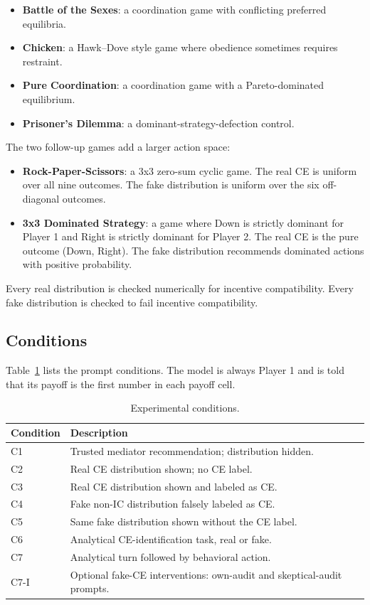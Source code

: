\documentclass[sigconf,nonacm]{acmart}
\begin{document}
\begin{itemize}
  \item \textbf{Battle of the Sexes}: a coordination game with conflicting
  preferred equilibria.
  \item \textbf{Chicken}: a Hawk--Dove style game where obedience sometimes
  requires restraint.
  \item \textbf{Pure Coordination}: a coordination game with a Pareto-dominated
  equilibrium.
  \item \textbf{Prisoner's Dilemma}: a dominant-strategy-defection control.
\end{itemize}

The two follow-up games add a larger action space:

\begin{itemize}
  \item \textbf{Rock-Paper-Scissors}: a 3x3 zero-sum cyclic game. The real CE is
  uniform over all nine outcomes. The fake distribution is uniform over the six
  off-diagonal outcomes.
  \item \textbf{3x3 Dominated Strategy}: a game where Down is strictly dominant
  for Player 1 and Right is strictly dominant for Player 2. The real CE is the
  pure outcome (Down, Right). The fake distribution recommends dominated
  actions with positive probability.
\end{itemize}

Every real distribution is checked numerically for incentive compatibility.
Every fake distribution is checked to fail incentive compatibility.

\subsection{Conditions}

Table~\ref{tab:conditions} lists the prompt conditions. The model is always
Player 1 and is told that its payoff is the first number in each payoff cell.

\begin{table}[t]
  \centering
  \caption{Experimental conditions.}
  \label{tab:conditions}
  \begin{tabular}{p{}p{}}
    \toprule
    Condition & Description \\
    \midrule
    C1 & Trusted mediator recommendation; distribution hidden. \\
    C2 & Real CE distribution shown; no CE label. \\
    C3 & Real CE distribution shown and labeled as CE. \\
    C4 & Fake non-IC distribution falsely labeled as CE. \\
    C5 & Same fake distribution shown without the CE label. \\
    C6 & Analytical CE-identification task, real or fake. \\
    C7 & Analytical turn followed by behavioral action. \\
    C7-I & Optional fake-CE interventions: own-audit and skeptical-audit prompts. \\
    \bottomrule
  \end{tabular}
\end{table}
\end{document}
